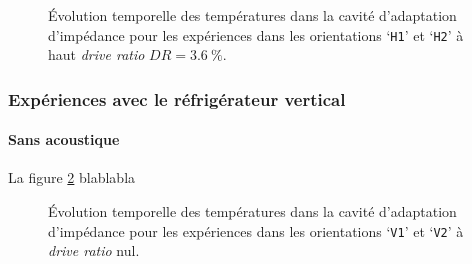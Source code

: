 \begin{figure}[!ht]
    \centering
    
    \caption{\'Evolution temporelle des températures dans la cavité d'adaptation d'impédance pour les expériences dans les orientations `\texttt{H1}' et `\texttt{H2}' à haut \textit{drive ratio} $DR=\qty{3.6}{\percent}$.}
    \label{fig:Acou_CHXout_H1H2_High}
\end{figure}


\subsubsection{Expériences avec le réfrigérateur vertical}
\paragraph{Sans acoustique}
La figure \ref{fig:HeatOnly_CHXout_V1V2} blablabla

\begin{figure}[!ht]
    \centering
    
    \caption{\'Evolution temporelle des températures dans la cavité d'adaptation d'impédance pour les expériences dans les orientations `\texttt{V1}' et `\texttt{V2}' à \textit{drive ratio} nul.}
    \label{fig:HeatOnly_CHXout_V1V2}
\end{figure}

